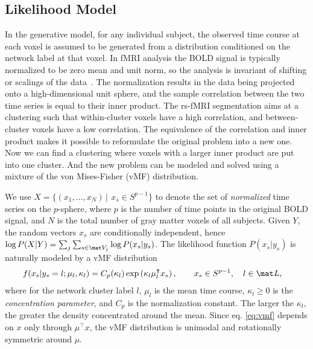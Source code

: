 \documentclass[review,authoryear]{elsarticle}
\begin{document}
\subsection{Likelihood Model}
In the generative model, for any individual subject, the observed time course at
each voxel is assumed to be generated from a distribution conditioned on the
network label at that voxel. In fMRI analysis the BOLD signal is typically
normalized to be zero mean and unit norm, so the analysis is invariant of
shifting or scalings of the data~\citep{golland2008spatial}. The normalization
results in the data being projected onto a high-dimensional unit sphere, and the
sample correlation between the two time series is equal to their inner
product. The rs-fMRI segmentation aims at a clustering such that within-cluster
voxels have a high correlation, and between-cluster voxels have a low
correlation. The equivalence of the correlation and inner product makes it
possible to reformulate the original problem into
a new one. Now we can find a clustering where voxels with a larger inner
product are put into one cluster. And the new problem can be modeled and solved
using a mixture of the von Mises-Fisher (vMF) distribution.

We use $ X = \{ (x_1, \dots, x_N)\, |\, \ x_s \in S^{p-1} \}$ to denote the set
of \emph{normalized} time series on the $p$-sphere, where $p$ is the number of time
points in the original BOLD signal, and $N$ is the total number of gray matter
voxels of all subjects. Given $Y$, the random vectors $ x_s$ are conditionally
independent, hence $\log P( X | Y) = \sum_j \sum_{s \in \mat V_j} \log P (x_s | y_s)$.
The likelihood function $P( x_s | y_s)$ is naturally modeled by a vMF
distribution
\begin{align}
 f ( x_s| y_s = l; \mu_l, \kappa_l) &= C_p(\kappa_l) \exp \left(\kappa_l  \mu_l^{\intercal} x_s\right), \qquad  x_s \in S^{p-1},  \quad  l \in {\mat L},\label{eq:vmf}
\end{align}
where for the network cluster label $l$, $\mu_l$ is the mean time course,
$\kappa_l \geq 0$ is the \emph{concentration parameter}, and $C_p$ is the
normalization constant. The larger the $\kappa_l$, the greater the density
concentrated around the mean. Since eq. \eqref{eq:vmf} depends on $x$ only through
$\mu^{\intercal} x$, the vMF distribution is unimodal and rotationally symmetric around
$\mu$.
\end{document}
